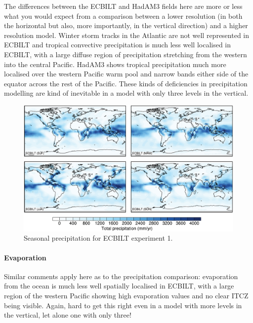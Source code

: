 \documentclass[a4paper,11pt,article]{article}
\begin{document}
The differences between the ECBILT and HadAM3 fields here are more or
less what you would expect from a comparison between a lower
resolution (in both the horizontal but also, more importantly, in the
vertical direction) and a higher resolution model.  Winter storm
tracks in the Atlantic are not well represented in ECBILT and tropical
convective precipitation is much less well localised in ECBILT, with a
large diffuse region of precipitation stretching from the western into
the central Pacific.  HadAM3 shows tropical precipitation much more
localised over the western Pacific warm pool and narrow bands either
side of the equator across the rest of the Pacific.  These kinds of
deficiencies in precipitation modelling are kind of inevitable in a
model with only three levels in the vertical.

\begin{figure}
  \begin{center}
    \includegraphics[width=\textwidth]{../expt-1/plots/pp-plots}
  \end{center}
  \caption{Seasonal precipitation for ECBILT experiment 1.}
  \label{fig:pp-1}
\end{figure}

\paragraph{Evaporation}

Similar comments apply here as to the precipitation comparison:
evaporation from the ocean is much less well spatially localised in
ECBILT, with a large region of the western Pacific showing high
evaporation values and no clear ITCZ being visible.  Again, hard to
get this right even in a model with more levels in the vertical, let
alone one with only three!
\end{document}
